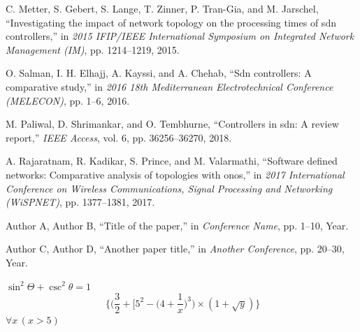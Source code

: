 \documentclass[12pt,a4paper]{article}
\begin{document}
	\begin{thebibliography}{9}
		C. Metter, S. Gebert, S. Lange, T. Zinner, P. Tran-Gia, and M. Jarschel,
		``Investigating the impact of network topology on the processing times of sdn controllers,'' in \textit{2015 IFIP/IEEE International Symposium on Integrated Network Management (IM)}, pp. 1214--1219, 2015.
		
		O. Salman, I. H. Elhajj, A. Kayssi, and A. Chehab, ``Sdn controllers: A comparative study,'' in \textit{2016 18th Mediterranean Electrotechnical Conference (MELECON)}, pp. 1--6, 2016.
		
		M. Paliwal, D. Shrimankar, and O. Tembhurne, ``Controllers in sdn: A review report,'' \textit{IEEE Access}, vol. 6, pp. 36256--36270, 2018.
		
		A. Rajaratnam, R. Kadikar, S. Prince, and M. Valarmathi, ``Software defined networks: Comparative analysis of topologies with onos,'' in \textit{2017 International Conference on Wireless Communications, Signal Processing and Networking (WiSPNET)}, pp. 1377--1381, 2017.
	\end{thebibliography}
	\begin{thebibliography}{99} %
		Author A, Author B,
		``Title of the paper,'' in \textit{Conference Name}, pp. 1--10, Year.
		
		Author C, Author D,
		``Another paper title,'' in \textit{Another Conference}, pp. 20--30, Year.

	\end{thebibliography}

	\(\sin^2 \Theta + \csc^2 \theta = 1 \)
	\[\ \Big\{\Big(\frac{3}{2}+\Big[5^2-\Big(4+\frac{1}{x}\Big)^3\Big)\times(1+\sqrt{y})\Big\}
	\]
	$\forall x \, (x > 5)$
\end{document}

